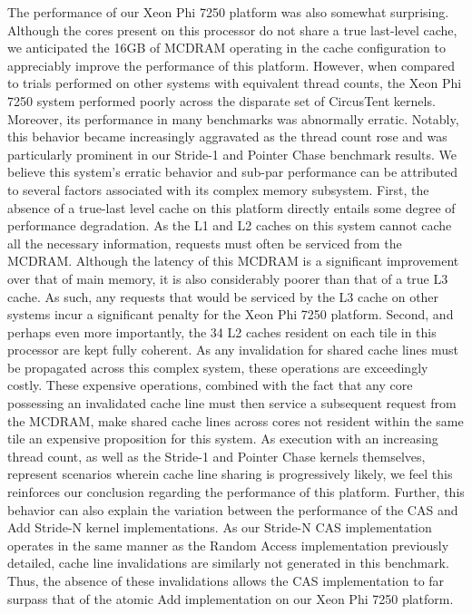 The performance of our Xeon Phi 7250 platform was also somewhat surprising.
Although the cores present on this processor do not share a true last-level cache, we anticipated the 16GB of MCDRAM operating in the cache configuration to appreciably improve the performance of this platform.
However, when compared to trials performed on other systems with equivalent thread counts, the Xeon Phi 7250 system performed poorly across the disparate set of CircusTent kernels.
Moreover, its performance in many benchmarks was abnormally erratic.
Notably, this behavior became increasingly aggravated as the thread count rose and was particularly prominent in our Stride-1 and Pointer Chase benchmark results.
We believe this system's erratic behavior and sub-par performance can be attributed to several factors associated with its complex memory subsystem.
First, the absence of a true-last level cache on this platform directly entails some degree of performance degradation.
As the L1 and L2 caches on this system cannot cache all the necessary information, requests must often be serviced from the MCDRAM.
Although the latency of this MCDRAM is a significant improvement over that of main memory, it is also considerably poorer than that of a true L3 cache.
As such, any requests that would be serviced by the L3 cache on other systems incur a significant penalty for the Xeon Phi 7250 platform.
Second, and perhaps even more importantly, the 34 L2 caches resident on each tile in this processor are kept fully coherent.
As any invalidation for shared cache lines must be propagated across this complex system, these operations are exceedingly costly.
These expensive operations, combined with the fact that any core possessing an invalidated cache line must then service a subsequent request from the MCDRAM, make shared cache lines across cores not resident within the same tile an expensive proposition for this system.
As execution with an increasing thread count, as well as the Stride-1 and Pointer Chase kernels themselves, represent scenarios wherein cache line sharing is progressively likely, we feel this reinforces our conclusion regarding the performance of this platform.
Further, this behavior can also explain the variation between the performance of the CAS and Add Stride-N kernel implementations.
As our Stride-N CAS implementation operates in the same manner as the Random Access implementation previously detailed, cache line invalidations are similarly not generated in this benchmark.
Thus, the absence of these invalidations allows the CAS implementation to far surpass that of the atomic Add implementation on our Xeon Phi 7250 platform.

